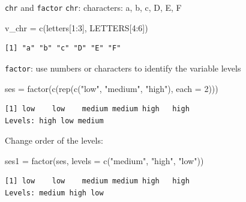\documentclass[
  ignorenonframetext,
]{beamer}
\newenvironment{Shaded}{\begin{snugshade}}{\end{snugshade}}
\newcommand{\AttributeTok}[1]{\textcolor[rgb]{0.00,0.34,0.68}{#1}}
\newcommand{\DecValTok}[1]{\textcolor[rgb]{0.69,0.50,0.00}{#1}}
\newcommand{\FunctionTok}[1]{\textcolor[rgb]{0.39,0.29,0.61}{#1}}
\newcommand{\NormalTok}[1]{\textcolor[rgb]{0.12,0.11,0.11}{#1}}
\newcommand{\OtherTok}[1]{\textcolor[rgb]{0.00,0.43,0.16}{#1}}
\newcommand{\SpecialCharTok}[1]{\textcolor[rgb]{0.24,0.68,0.91}{#1}}
\newcommand{\StringTok}[1]{\textcolor[rgb]{0.75,0.01,0.01}{#1}}
\begin{document}
\begin{frame}[fragile]{\texttt{chr} and \texttt{factor}}
\protect\hypertarget{chr-and-factor}{}
\texttt{chr}: characters: a, b, c, D, E, F

\begin{Shaded}
\begin{Highlighting}[]
\NormalTok{v\_chr }\OtherTok{=} \FunctionTok{c}\NormalTok{(letters[}\DecValTok{1}\SpecialCharTok{:}\DecValTok{3}\NormalTok{], LETTERS[}\DecValTok{4}\SpecialCharTok{:}\DecValTok{6}\NormalTok{])}
\end{Highlighting}
\end{Shaded}

\begin{verbatim}
[1] "a" "b" "c" "D" "E" "F"
\end{verbatim}

\texttt{factor}: use numbers or characters to identify the variable
levels

\begin{Shaded}
\begin{Highlighting}[]
\NormalTok{ses }\OtherTok{=} \FunctionTok{factor}\NormalTok{(}\FunctionTok{c}\NormalTok{(}\FunctionTok{rep}\NormalTok{(}\FunctionTok{c}\NormalTok{(}\StringTok{"low"}\NormalTok{, }\StringTok{"medium"}\NormalTok{, }\StringTok{"high"}\NormalTok{), }\AttributeTok{each =} \DecValTok{2}\NormalTok{)))}
\end{Highlighting}
\end{Shaded}

\begin{verbatim}
[1] low    low    medium medium high   high  
Levels: high low medium
\end{verbatim}

Change order of the levels:

\begin{Shaded}
\begin{Highlighting}[]
\NormalTok{ses1 }\OtherTok{=} \FunctionTok{factor}\NormalTok{(ses, }\AttributeTok{levels =} \FunctionTok{c}\NormalTok{(}\StringTok{"medium"}\NormalTok{, }\StringTok{"high"}\NormalTok{, }\StringTok{"low"}\NormalTok{)) }
\end{Highlighting}
\end{Shaded}

\begin{verbatim}
[1] low    low    medium medium high   high  
Levels: medium high low
\end{verbatim}
\end{frame}
\end{document}
